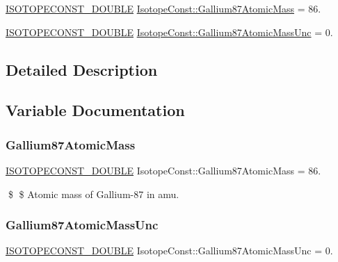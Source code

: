 \begin{DoxyCompactItemize}
\item 
\mbox{\hyperlink{group___isotope_const-_macros_ga8f45a7272ce02c0b4c65c44636ed719a}{I\+S\+O\+T\+O\+P\+E\+C\+O\+N\+S\+T\+\_\+\+D\+O\+U\+B\+LE}} \mbox{\hyperlink{group___isotope_const-_gallium-_ga87_gaa486ca7e5f51fce2a5db6d8a38fa6bbe}{Isotope\+Const\+::\+Gallium87\+Atomic\+Mass}} = 86.
\item 
\mbox{\hyperlink{group___isotope_const-_macros_ga8f45a7272ce02c0b4c65c44636ed719a}{I\+S\+O\+T\+O\+P\+E\+C\+O\+N\+S\+T\+\_\+\+D\+O\+U\+B\+LE}} \mbox{\hyperlink{group___isotope_const-_gallium-_ga87_ga126b41d5a16e70686afa231295fbffb9}{Isotope\+Const\+::\+Gallium87\+Atomic\+Mass\+Unc}} = 0.
\end{DoxyCompactItemize}


\subsection{Detailed Description}


\subsection{Variable Documentation}
\mbox{\label{group___isotope_const-_gallium-_ga87_gaa486ca7e5f51fce2a5db6d8a38fa6bbe}} 
\subsubsection{\texorpdfstring{Gallium87\+Atomic\+Mass}{Gallium87AtomicMass}}
{\footnotesize\ttfamily \mbox{\hyperlink{group___isotope_const-_macros_ga8f45a7272ce02c0b4c65c44636ed719a}{I\+S\+O\+T\+O\+P\+E\+C\+O\+N\+S\+T\+\_\+\+D\+O\+U\+B\+LE}} Isotope\+Const\+::\+Gallium87\+Atomic\+Mass = 86.}

\$ \$ Atomic mass of Gallium-\/87 in amu. \mbox{\label{group___isotope_const-_gallium-_ga87_ga126b41d5a16e70686afa231295fbffb9}} 
\subsubsection{\texorpdfstring{Gallium87\+Atomic\+Mass\+Unc}{Gallium87AtomicMassUnc}}
{\footnotesize\ttfamily \mbox{\hyperlink{group___isotope_const-_macros_ga8f45a7272ce02c0b4c65c44636ed719a}{I\+S\+O\+T\+O\+P\+E\+C\+O\+N\+S\+T\+\_\+\+D\+O\+U\+B\+LE}} Isotope\+Const\+::\+Gallium87\+Atomic\+Mass\+Unc = 0.}

